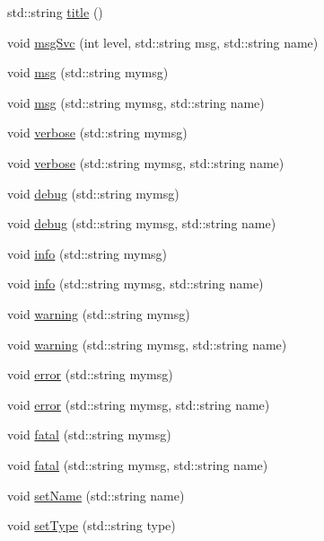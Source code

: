 \begin{DoxyCompactItemize}
\item 
std::string \hyperlink{classObject_a73a0f1a41828fdd8303dd662446fb6c3}{title} ()
\item 
void \hyperlink{classObject_a3f9d5537ebce0c0f2bf6ae4d92426f3c}{msgSvc} (int level, std::string msg, std::string name)
\item 
void \hyperlink{classObject_a58b2d0618c2d08cf2383012611528d97}{msg} (std::string mymsg)
\item 
void \hyperlink{classObject_ac5d59299273cee27aacf7de00d2e7034}{msg} (std::string mymsg, std::string name)
\item 
void \hyperlink{classObject_a83d2db2df682907ea1115ad721c1c4a1}{verbose} (std::string mymsg)
\item 
void \hyperlink{classObject_a2d4120195317e2a3c6532e8bb9f3da68}{verbose} (std::string mymsg, std::string name)
\item 
void \hyperlink{classObject_aac010553f022165573714b7014a15f0d}{debug} (std::string mymsg)
\item 
void \hyperlink{classObject_a6c9a0397ca804e04d675ed05683f5420}{debug} (std::string mymsg, std::string name)
\item 
void \hyperlink{classObject_a644fd329ea4cb85f54fa6846484b84a8}{info} (std::string mymsg)
\item 
void \hyperlink{classObject_a1ca123253dfd30fc28b156f521dcbdae}{info} (std::string mymsg, std::string name)
\item 
void \hyperlink{classObject_a65cd4fda577711660821fd2cd5a3b4c9}{warning} (std::string mymsg)
\item 
void \hyperlink{classObject_a11f101db4dd73d9391b0231818881d86}{warning} (std::string mymsg, std::string name)
\item 
void \hyperlink{classObject_a204a95f57818c0f811933917a30eff45}{error} (std::string mymsg)
\item 
void \hyperlink{classObject_ad7f6c457733082efa2f9ff5f5c8e119a}{error} (std::string mymsg, std::string name)
\item 
void \hyperlink{classObject_aad5a16aac7516ce65bd5ec02ab07fc80}{fatal} (std::string mymsg)
\item 
void \hyperlink{classObject_ae62acd3d09f716220f75f252dc38bc9a}{fatal} (std::string mymsg, std::string name)
\item 
void \hyperlink{classObject_ae30fea75683c2d149b6b6d17c09ecd0c}{setName} (std::string name)
\item 
void \hyperlink{classObject_aae534cc9d982bcb9b99fd505f2e103a5}{setType} (std::string type)

\end{DoxyCompactItemize}
